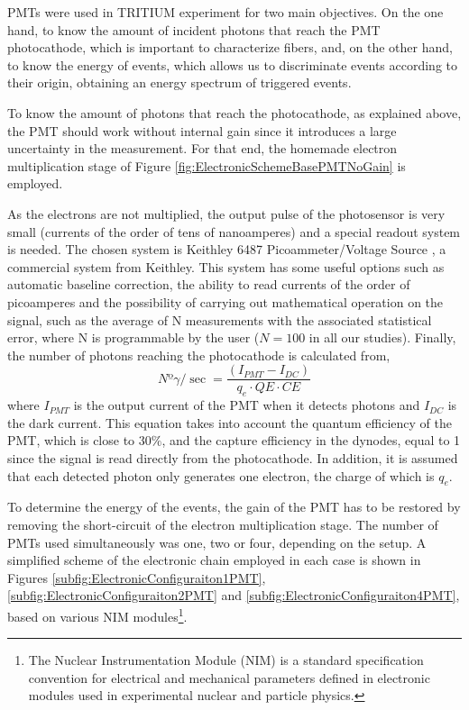 PMTs were used in TRITIUM experiment for two main objectives. On the one hand, to know the amount of incident photons that reach the PMT photocathode, which is important to characterize fibers, and, on the other hand, to know the energy of events, which allows us to discriminate events according to their origin, obtaining an energy spectrum of triggered events. 

To know the amount of photons that reach the photocathode, as explained above, the PMT should work without internal gain since it introduces a large uncertainty in the measurement. For that end, the homemade electron multiplication stage of Figure \ref{fig:ElectronicSchemeBasePMTNoGain} is employed. 

As the electrons are not multiplied, the output pulse of the photosensor is very small (currents of the order of tens of nanoamperes) and a special readout system is needed. The chosen system is Keithley 6487 Picoammeter/Voltage Source \cite{DataSheetKeithley6487}, a commercial system from Keithley. This system has some useful options such as automatic baseline correction, the ability to read currents of the order of picoamperes and the possibility of carrying out mathematical operation on the signal, such as the average of N measurements with the associated statistical error, where N is programmable by the user ($N=100$ in all our studies). Finally, the number of photons reaching the photocathode is calculated from,
\begin{equation}
Nº\gamma/\sec = \frac{\left( I_{PMT} - I_{DC} \right)}{q_e \cdot{} QE \cdot{} CE}
\label{eq:NumPhotonsFromIntensityPMT}
\end{equation}
where $I_{PMT}$ is the output current of the PMT when it detects photons and $I_{DC}$ is the dark current. This equation takes into account the quantum efficiency of the PMT, which is close to $30\%$, and the capture efficiency in the dynodes, equal to 1 since the signal is read directly from the photocathode. In addition, it is assumed that each detected photon only generates one electron, the charge of which is $q_e$. 

To determine the energy of the events, the gain of the PMT has to be restored by removing the short-circuit of the electron multiplication stage. The number of PMTs used simultaneously was one, two or four, depending on the setup. A simplified scheme of the electronic chain employed in each case is shown in Figures \ref{subfig:ElectronicConfiguraiton1PMT}, \ref{subfig:ElectronicConfiguraiton2PMT} and \ref{subfig:ElectronicConfiguraiton4PMT}, based on various NIM modules\footnote{The Nuclear Instrumentation Module (NIM) is a standard specification convention for electrical and mechanical parameters defined in electronic modules used in experimental nuclear and particle physics.}.

